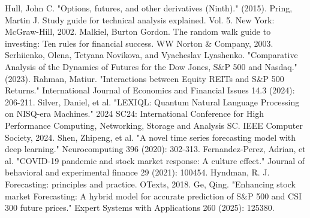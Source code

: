 \documentclass[conference]{IEEEtran}
\begin{document}
\begin{thebibliography}{00}
 Hull, John C. "Options, futures, and other derivatives (Ninth)." (2015).
 Pring, Martin J. Study guide for technical analysis explained. Vol. 5. New York: McGraw-Hill, 2002.
 Malkiel, Burton Gordon. The random walk guide to investing: Ten rules for financial success. WW Norton \& Company, 2003.
 Serhiienko, Olena, Tetyana Novikova, and Vyacheslav Lyashenko. "Comparative Analysis of the Dynamics of Futures for the Dow Jones, S\&P 500 and Nasdaq." (2023).
 Rahman, Matiur. "Interactions between Equity REITs and S\&P 500 Returns." International Journal of Economics and Financial Issues 14.3 (2024): 206-211.
 Silver, Daniel, et al. "LEXIQL: Quantum Natural Language Processing on NISQ-era Machines." 2024 SC24: International Conference for High Performance Computing, Networking, Storage and Analysis SC. IEEE Computer Society, 2024.
 Shen, Zhipeng, et al. "A novel time series forecasting model with deep learning." Neurocomputing 396 (2020): 302-313.
 Fernandez-Perez, Adrian, et al. "COVID-19 pandemic and stock market response: A culture effect." Journal of behavioral and experimental finance 29 (2021): 100454.
 Hyndman, R. J. Forecasting: principles and practice. OTexts, 2018.
 Ge, Qing. "Enhancing stock market Forecasting: A hybrid model for accurate prediction of S\&P 500 and CSI 300 future prices." Expert Systems with Applications 260 (2025): 125380.

\end{thebibliography}
\vspace{12pt}
\end{document}
